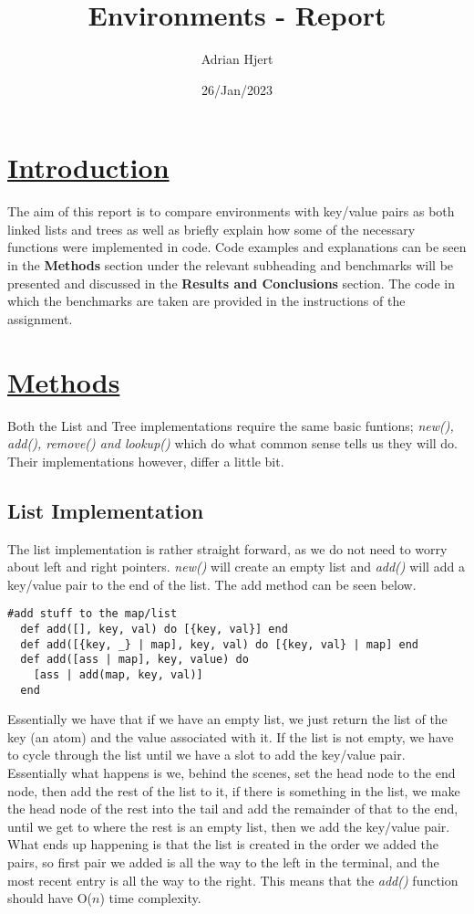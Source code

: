 \documentclass[a4paper,11pt]{article}
\begin{document}
\title{
\textbf{Environments - Report}
}
\author{Adrian Hjert}
\date{26/Jan/2023}

\maketitle

\section*{
	\underline{Introduction}
	}
The aim of this report is to compare environments with key/value pairs as both linked lists and trees as well as briefly explain how some of the necessary functions were implemented in code. Code examples and explanations can be seen in the \textbf{Methods} section under the relevant subheading and benchmarks will be presented and discussed in the \textbf{Results and Conclusions} section. The code in which the benchmarks are taken are provided in the instructions of the assignment.

\section*{
	\underline{Methods}
	}
Both the List and Tree implementations require the same basic funtions; \textit{new(), add(), remove() and lookup()} which do what common sense tells us they will do. Their implementations however, differ a little bit.
\subsection*{
	\textbf{List Implementation}
	}
The list implementation is rather straight forward, as we do not need to worry about left and right pointers. \textit{new()} will create an empty list and \textit{add()} will add a key/value pair to the end of the list.  The add method can be seen below.

\begin{verbatim}
#add stuff to the map/list
  def add([], key, val) do [{key, val}] end
  def add([{key, _} | map], key, val) do [{key, val} | map] end
  def add([ass | map], key, value) do
    [ass | add(map, key, val)]
  end
  \end{verbatim}

Essentially we have that if we have an empty list, we just return the list of the key (an atom) and the value associated with it. If the list is not empty, we have to cycle through the list until we have a slot to add the key/value pair. Essentially what happens is we, behind the scenes, set the head node to the end node, then add the rest of the list to it, if there is something in the list, we make the head node of the rest into the tail and add the remainder of that to the end, until we get to where the rest is an empty list, then we add the key/value pair. What ends up happening is that the list is created in the order we added the pairs, so first pair we added is all the way to the left in the terminal, and the most recent entry is all the way to the right. This means that the \textit{add()} function should have O($n$) time complexity.\\
\end{document}
